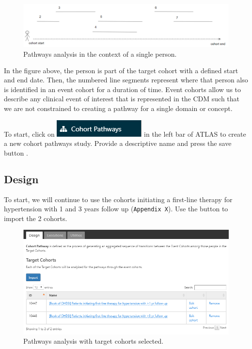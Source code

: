 \documentclass[11pt]{book}
\theoremstyle{definition}
\theoremstyle{definition}
\theoremstyle{definition}
\theoremstyle{remark}
\begin{document}
\begin{figure}

{\centering \includegraphics[width=1\linewidth]{images/Characterization/pathwaysPersonEventView} 

}

\caption{Pathways analysis in the context of a single person.}\label{fig:pathwaysPersonEventView}
\end{figure}

In the figure above, the person is part of the target cohort with a defined start and end date. Then, the numbered line segments represent where that person also is identified in an event cohort for a duration of time. Event cohorts allow us to describe any clinical event of interest that is represented in the CDM such that we are not constrained to creating a pathway for a single domain or concept.

To start, click on \includegraphics{images/Characterization/atlasPathwaysMenuItem.png} in the left bar of ATLAS to create a new cohort pathways study. Provide a descriptive name and press the save button .

\hypertarget{design-1}{%
\subsection{Design}\label{design-1}}

To start, we will continue to use the cohorts initiating a first-line therapy for hypertension with 1 and 3 years follow up (\texttt{Appendix\ X}). Use the button to import the 2 cohorts.

\begin{figure}

{\centering \includegraphics[width=1\linewidth]{images/Characterization/atlasPathwaysTargetCohorts} 

}

\caption{Pathways analysis with target cohorts selected.}\label{fig:atlasPathwaysTargetCohorts}
\end{figure}
\end{document}
